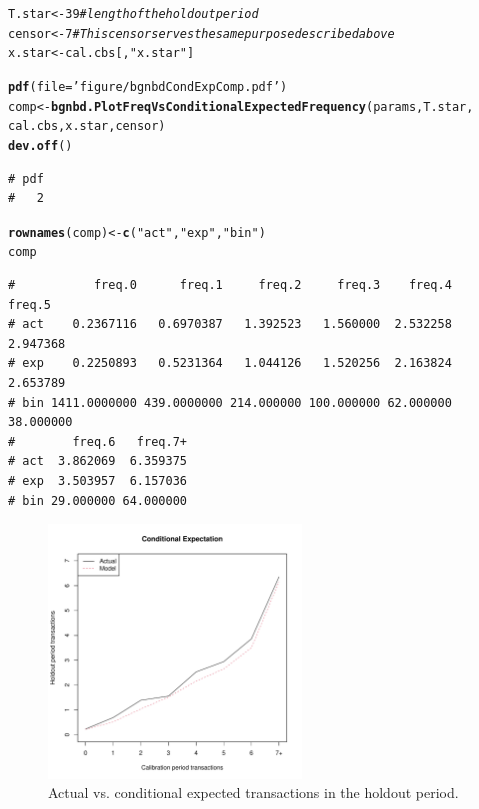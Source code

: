 \documentclass[10pt, letterpaper, onecolumn, oneside, final]{article}\usepackage[]{graphicx}\usepackage[]{color}
\makeatletter
\newcommand{\hlnum}[1]{\textcolor[rgb]{0.686,0.059,0.569}{#1}}%
\newcommand{\hlstr}[1]{\textcolor[rgb]{0.192,0.494,0.8}{#1}}%
\newcommand{\hlcom}[1]{\textcolor[rgb]{0.678,0.584,0.686}{\textit{#1}}}%
\newcommand{\hlstd}[1]{\textcolor[rgb]{0.345,0.345,0.345}{#1}}%
\newcommand{\hlkwb}[1]{\textcolor[rgb]{0.69,0.353,0.396}{#1}}%
\newcommand{\hlkwc}[1]{\textcolor[rgb]{0.333,0.667,0.333}{#1}}%
\newcommand{\hlkwd}[1]{\textcolor[rgb]{0.737,0.353,0.396}{\textbf{#1}}}%
\newenvironment{kframe}{%
 \def\at@end@of@kframe{}%
 \ifinner\ifhmode%
  \def\at@end@of@kframe{\end{minipage}}%
  \begin{minipage}{\columnwidth}%
 \fi\fi%
 \def\FrameCommand##1{\hskip\@totalleftmargin \hskip-\fboxsep
 \colorbox{shadecolor}{##1}\hskip-\fboxsep
     \hskip-\linewidth \hskip-\@totalleftmargin \hskip\columnwidth}%
 \MakeFramed {\advance\hsize-\width
   \@totalleftmargin\z@ \linewidth\hsize
   \@setminipage}}%
 {\par\unskip\endMakeFramed%
 \at@end@of@kframe}
\newenvironment{knitrout}{}{} %
\makeatother
\begin{document}
\begin{knitrout}\small
{}\color{fgcolor}\begin{kframe}
\begin{alltt}
\hlstd{T.star} \hlkwb{<-} \hlnum{39} \hlcom{# length of the holdout period}
\hlstd{censor} \hlkwb{<-} \hlnum{7}  \hlcom{# This censor serves the same purpose described above}
\hlstd{x.star} \hlkwb{<-} \hlstd{cal.cbs[,}\hlstr{"x.star"}\hlstd{]}

\hlkwd{pdf}\hlstd{(}\hlkwc{file} \hlstd{=} \hlstr{'figure/bgnbdCondExpComp.pdf'}\hlstd{)}
\hlstd{comp} \hlkwb{<-} \hlkwd{bgnbd.PlotFreqVsConditionalExpectedFrequency}\hlstd{(params, T.star,}
                                              \hlstd{cal.cbs, x.star, censor)}
\hlkwd{dev.off}\hlstd{()}
\end{alltt}
\begin{verbatim}
# pdf 
#   2
\end{verbatim}
\begin{alltt}
\hlkwd{rownames}\hlstd{(comp)} \hlkwb{<-} \hlkwd{c}\hlstd{(}\hlstr{"act"}\hlstd{,} \hlstr{"exp"}\hlstd{,} \hlstr{"bin"}\hlstd{)}
\hlstd{comp}
\end{alltt}
\begin{verbatim}
#           freq.0      freq.1     freq.2     freq.3    freq.4    freq.5
# act    0.2367116   0.6970387   1.392523   1.560000  2.532258  2.947368
# exp    0.2250893   0.5231364   1.044126   1.520256  2.163824  2.653789
# bin 1411.0000000 439.0000000 214.000000 100.000000 62.000000 38.000000
#        freq.6   freq.7+
# act  3.862069  6.359375
# exp  3.503957  6.157036
# bin 29.000000 64.000000
\end{verbatim}
\end{kframe}
\end{knitrout}

\begin{figure}
  \begin{center}
  \includegraphics[width=0.6\textwidth]{figure/bgnbdCondExpComp}
  \caption{Actual vs. conditional expected transactions in the holdout period.}\label{fig:bgnbdCondExpComp}
  \end{center}
\end{figure}
\end{document}
